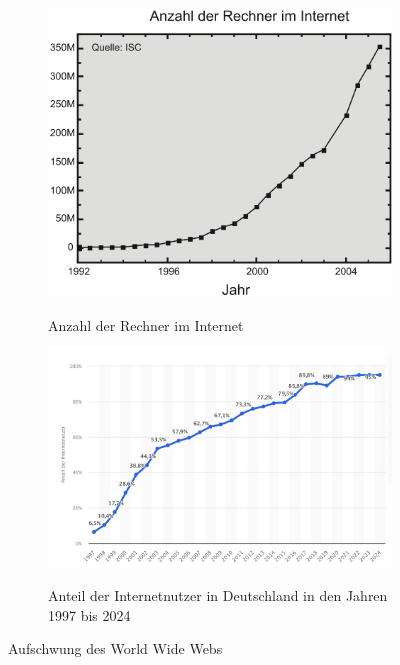 \begin{figure}[h!]
    \centering
    \begin{subfigure}[b]{0.48\textwidth}
        \centering
        \includegraphics[width=\textwidth]{img/Anzahl_Rechner_im_Internet-2004.png}
        \caption{Anzahl der Rechner im Internet}
        \label{fig:rechner_internet}
		\cite{internet_systems_consortium_internet_2005}
    \end{subfigure}
    \hfill
    \begin{subfigure}[b]{0.48\textwidth}
        \centering
        \includegraphics[width=\textwidth]{img/Anzahl_Internetnutzer-2024.png}
        \caption{Anteil der Internetnutzer in Deutschland in den Jahren 1997 bis 2024}
        \label{fig:internetnutzer}
		\cite{statista_anteil_2024}
    \end{subfigure}
    \caption{Aufschwung des World Wide Webs}
    \label{fig:www}
\end{figure}

